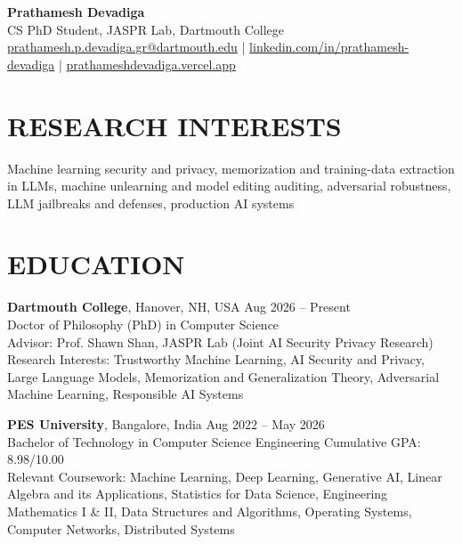 \documentclass[a4paper,9pt]{extarticle}
\begin{document}
\pagestyle{fancy}
\renewcommand{\headrulewidth}{0pt}
\fancyhead{}
\thispagestyle{empty}

\begin{flushleft}
\textbf{\LARGE Prathamesh Devadiga}\\[2pt]
CS PhD Student, JASPR Lab, Dartmouth College
\\ \href{mailto:prathamesh.p.devadiga.gr@dartmouth.edu}{prathamesh.p.devadiga.gr@dartmouth.edu} | \href{https://www.linkedin.com/in/prathamesh-devadiga}{linkedin.com/in/prathamesh-devadiga} | \href{https://prathameshdevadiga.vercel.app}{prathameshdevadiga.vercel.app}
\end{flushleft}

\section*{RESEARCH INTERESTS}
\noindent
Machine learning security and privacy, memorization and training-data extraction in LLMs, machine unlearning and model editing auditing, adversarial robustness, LLM jailbreaks and defenses, production AI systems

\section*{EDUCATION}

\noindent
\textbf{Dartmouth College}, Hanover, NH, USA \hfill Aug 2026 -- Present\\
Doctor of Philosophy (PhD) in Computer Science\\
Advisor: Prof. Shawn Shan, JASPR Lab (Joint AI Security Privacy Research)\\
Research Interests: Trustworthy Machine Learning, AI Security and Privacy, Large Language Models, Memorization and Generalization Theory, Adversarial Machine Learning, Responsible AI Systems

\vspace{0.5em}

\noindent
\textbf{PES University}, Bangalore, India \hfill Aug 2022 -- May 2026\\
Bachelor of Technology in Computer Science Engineering \hfill Cumulative GPA: 8.98/10.00\\
Relevant Coursework: Machine Learning, Deep Learning, Generative AI, Linear Algebra and its Applications, Statistics for Data Science, Engineering Mathematics I \& II, Data Structures and Algorithms, Operating Systems, Computer Networks, Distributed Systems
\end{document}
